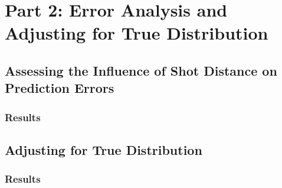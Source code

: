 \documentclass[fleqn,moreauthors,10pt]{ds_report}
\begin{document}


\section*{Part 2: Error Analysis and Adjusting for True Distribution}

\subsection*{Assessing the Influence of Shot Distance on Prediction Errors}


\subsubsection*{Results}



\subsection*{Adjusting for True Distribution}


\subsubsection*{Results}














\end{document}
